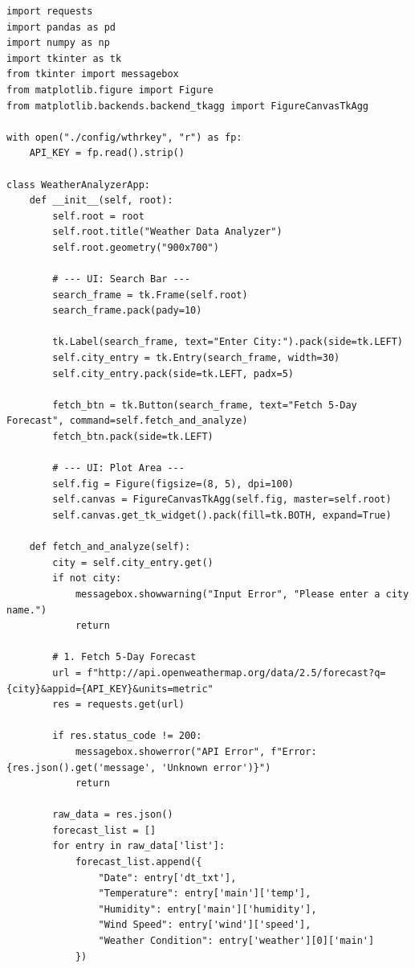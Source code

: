 \documentclass[a4paper]{article}
\begin{document}
\begin{verbatim}
import requests
import pandas as pd
import numpy as np
import tkinter as tk
from tkinter import messagebox
from matplotlib.figure import Figure
from matplotlib.backends.backend_tkagg import FigureCanvasTkAgg

with open("./config/wthrkey", "r") as fp:
    API_KEY = fp.read().strip()

class WeatherAnalyzerApp:
    def __init__(self, root):
        self.root = root
        self.root.title("Weather Data Analyzer")
        self.root.geometry("900x700")

        # --- UI: Search Bar ---
        search_frame = tk.Frame(self.root)
        search_frame.pack(pady=10)
        
        tk.Label(search_frame, text="Enter City:").pack(side=tk.LEFT)
        self.city_entry = tk.Entry(search_frame, width=30)
        self.city_entry.pack(side=tk.LEFT, padx=5)
        
        fetch_btn = tk.Button(search_frame, text="Fetch 5-Day Forecast", command=self.fetch_and_analyze)
        fetch_btn.pack(side=tk.LEFT)

        # --- UI: Plot Area ---
        self.fig = Figure(figsize=(8, 5), dpi=100)
        self.canvas = FigureCanvasTkAgg(self.fig, master=self.root)
        self.canvas.get_tk_widget().pack(fill=tk.BOTH, expand=True)

    def fetch_and_analyze(self):
        city = self.city_entry.get()
        if not city:
            messagebox.showwarning("Input Error", "Please enter a city name.")
            return

        # 1. Fetch 5-Day Forecast
        url = f"http://api.openweathermap.org/data/2.5/forecast?q={city}&appid={API_KEY}&units=metric"
        res = requests.get(url)
        
        if res.status_code != 200:
            messagebox.showerror("API Error", f"Error: {res.json().get('message', 'Unknown error')}")
            return

        raw_data = res.json()
        forecast_list = []
        for entry in raw_data['list']:
            forecast_list.append({
                "Date": entry['dt_txt'],
                "Temperature": entry['main']['temp'],
                "Humidity": entry['main']['humidity'],
                "Wind Speed": entry['wind']['speed'],
                "Weather Condition": entry['weather'][0]['main']
            })
        

\end{verbatim}
\end{document}
